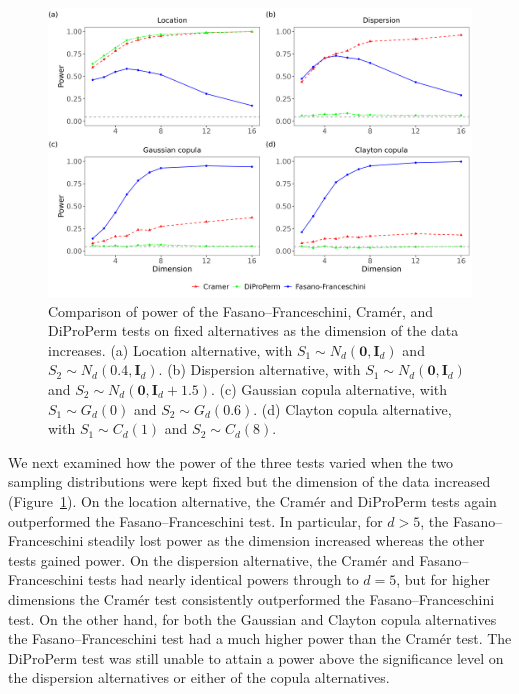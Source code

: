 \begin{figure}[htbp]
\centering
\includegraphics[scale=0.50]{figures/fig6.png}
\caption{Comparison of power of the Fasano--Franceschini, Cram\'er, and DiProPerm tests on fixed alternatives as the dimension of the data increases. (a) Location alternative, with $S_{1}\sim N_{d}(\mathbf{0},\mathbf{I}_{d})$ and $S_{2}\sim N_{d}(\mathbf{0.4},\mathbf{I}_{d})$. (b) Dispersion alternative, with $S_{1}\sim N_{d}(\mathbf{0},\mathbf{I}_{d})$ and $S_{2}\sim N_{d}(\mathbf{0},\mathbf{I}_{d}+1.5)$. (c) Gaussian copula alternative, with $S_{1}\sim G_{d}(0)$ and $S_{2}\sim G_{d}(0.6)$. (d) Clayton copula alternative, with $S_{1}\sim C_{d}(1)$ and $S_{2}\sim C_{d}(8)$.}
\label{figure:dimension_power}
\end{figure}

We next examined how the power of the three tests varied when the two sampling distributions were kept fixed but the dimension of the data increased (Figure~\ref{figure:dimension_power}). On the location alternative, the Cram\'er and DiProPerm tests again outperformed the Fasano--Franceschini test. In particular, for $d>5$, the Fasano--Franceschini steadily lost power as the dimension increased whereas the other tests gained power. On the dispersion alternative, the Cram\'er and Fasano--Franceschini tests had nearly identical powers through to $d=5$, but for higher dimensions the Cram\'er test consistently outperformed the Fasano--Franceschini test. On the other hand, for both the Gaussian and Clayton copula alternatives the Fasano--Franceschini test had a much higher power than the Cram\'er test. The DiProPerm test was still unable to attain a power above the significance level on the dispersion alternatives or either of the copula alternatives.

